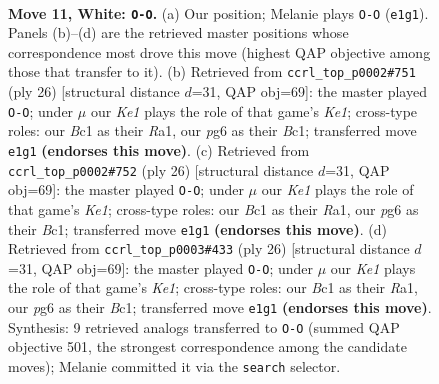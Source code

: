 \documentclass[11pt]{article}
\begin{document}
\clearpage

\begin{figure}[p]\centering
\begin{subfigure}{0.46\textwidth}\centering
\resizebox{\linewidth}{!}{%
\newchessgame
\chessboard[
  setfen={rnbr2k1/ppp2p1p/6p1/4b3/2P1N3/8/PP2BPPP/R1B1K2R w KQ - 0 11},
  showmover=false,
  pgfstyle=straightmove, color=movearrow, markmove={e1-g1}
]}
\caption{}
\end{subfigure}\hfill
\begin{subfigure}{0.46\textwidth}\centering
\resizebox{\linewidth}{!}{%
\newchessgame
\chessboard[
  setfen={r2k1b1r/pp2pp1p/6p1/1B1b4/8/2P5/P2P1PPP/R1B1K2R w KQ - 2 14},
  showmover=false,
  pgfstyle=straightmove, color=movearrow, markmove={e1-g1}
]}
\caption{}
\end{subfigure}
\\[4pt]
\begin{subfigure}{0.46\textwidth}\centering
\resizebox{\linewidth}{!}{%
\newchessgame
\chessboard[
  setfen={r2k1b1r/pp2pp1p/6p1/1B1b4/8/2P5/P2P1PPP/R1B1K2R w KQ - 2 14},
  showmover=false,
  pgfstyle=straightmove, color=movearrow, markmove={e1-g1}
]}
\caption{}
\end{subfigure}\hfill
\begin{subfigure}{0.46\textwidth}\centering
\resizebox{\linewidth}{!}{%
\newchessgame
\chessboard[
  setfen={r2k1b1r/pp2pp1p/6p1/1B1b4/8/2P5/P2P1PPP/R1B1K2R w KQ - 2 14},
  showmover=false,
  pgfstyle=straightmove, color=movearrow, markmove={e1-g1}
]}
\caption{}
\end{subfigure}
\caption{\textbf{Move 11, White: \texttt{O-O}.} (a) Our position; Melanie plays \texttt{O-O} (\texttt{e1g1}). Panels (b)--(d) are the retrieved master positions whose correspondence most drove this move (highest QAP objective among those that transfer to it). (b) Retrieved from \texttt{ccrl\_top\_p0002\#751} (ply 26) [structural distance $d$=31, QAP obj=69]: the master played \texttt{O-O}; under $\mu$ our \emph{Ke1} plays the role of that game's \emph{Ke1}; cross-type roles: our \emph{B}c1 as their \emph{R}a1, our \emph{p}g6 as their \emph{B}c1; transferred move \texttt{e1g1} \textbf{(endorses this move)}. (c) Retrieved from \texttt{ccrl\_top\_p0002\#752} (ply 26) [structural distance $d$=31, QAP obj=69]: the master played \texttt{O-O}; under $\mu$ our \emph{Ke1} plays the role of that game's \emph{Ke1}; cross-type roles: our \emph{B}c1 as their \emph{R}a1, our \emph{p}g6 as their \emph{B}c1; transferred move \texttt{e1g1} \textbf{(endorses this move)}. (d) Retrieved from \texttt{ccrl\_top\_p0003\#433} (ply 26) [structural distance $d$=31, QAP obj=69]: the master played \texttt{O-O}; under $\mu$ our \emph{Ke1} plays the role of that game's \emph{Ke1}; cross-type roles: our \emph{B}c1 as their \emph{R}a1, our \emph{p}g6 as their \emph{B}c1; transferred move \texttt{e1g1} \textbf{(endorses this move)}. Synthesis: 9 retrieved analogs transferred to \texttt{O-O} (summed QAP objective 501, the strongest correspondence among the candidate moves); Melanie committed it via the \texttt{search} selector.}
\label{fig:thought-m20}
\end{figure}
\end{document}

